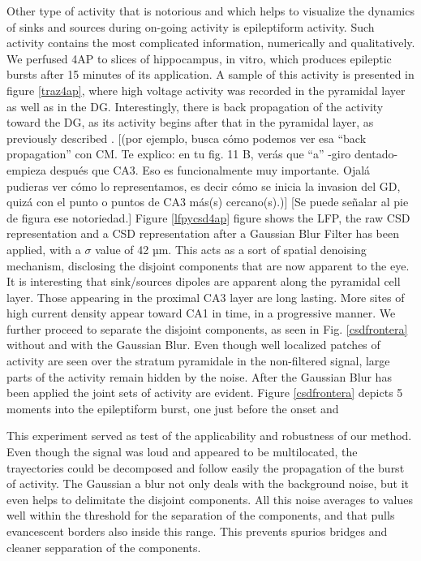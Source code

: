 \documentclass[letterpaper,12pts]{article}
\newcommand{\komment}[1]{{\color{red} [#1]}}
\newcommand{\romment}[1]{{\color{blue} [#1]}}
\begin{document}
  Other type of activity that is notorious and which helps to visualize the dynamics of sinks and sources during on-going activity is epileptiform activity. Such activity contains the most complicated information, numerically and qualitatively. We perfused 4AP to slices of hippocampus, in vitro, which produces epileptic bursts after 15 minutes of its application. A sample of this activity is presented in figure \ref{traz4ap}, where high voltage activity was recorded in the pyramidal layer as well as in the DG. Interestingly, there is back propagation of the activity toward the DG, as its activity begins after that in the pyramidal layer, as previously described \cite{Franco2018}.
  \romment{(por ejemplo, busca cómo podemos ver esa “back propagation” con CM. Te explico: en tu fig. 11 B, verás que “a” -giro dentado- empieza después que CA3. Eso es funcionalmente muy importante. Ojalá pudieras ver cómo lo representamos, es decir cómo se inicia la invasion del GD, quizá con el punto o puntos de CA3 más(s) cercano(s).)}
  \komment{Se puede señalar al pie de figura ese notoriedad.}
  Figure \ref{lfpycsd4ap} figure shows the LFP, the raw CSD representation and a CSD representation after a Gaussian Blur Filter has been applied, with a $\sigma$ value of 42 µm. This acts as a sort of spatial denoising mechanism, disclosing the disjoint components that are now apparent to the eye. It is interesting that sink/sources dipoles are apparent along the pyramidal cell layer. Those appearing in the proximal CA3 layer are long lasting. More sites of high current density appear toward CA1 in time, in a progressive manner.
  We further proceed to separate the disjoint components, as seen in Fig. \ref{csdfrontera} without and with the Gaussian Blur. Even though well localized patches of activity are seen over the stratum pyramidale in the non-filtered signal, large parts of the activity remain hidden by the noise. After the Gaussian Blur has been applied the joint sets of activity are evident. Figure \ref{csdfrontera} depicts 5 moments into the epileptiform burst, one just before the onset and
  
  This experiment served as test of the applicability and robustness of our method. Even though the signal was loud and appeared to be multilocated, the trayectories could be
  decomposed and follow easily the propagation of the burst of activity. The Gaussian a
  blur not only deals with the background noise, but it even helps to delimitate
  the disjoint components. All this noise averages to values well within
  the threshold for the separation of the components, and that pulls
  evancescent borders also inside this range. This prevents spurios bridges and
  cleaner sepparation of the components.
\end{document}
